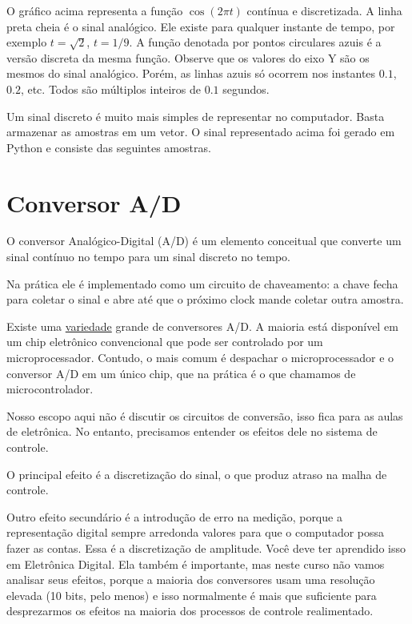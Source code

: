 \documentclass[
]{book}
\begin{document}
O gráfico acima representa a função \(\cos(2\pi t)\) contínua e discretizada. A linha preta cheia é o sinal analógico. Ele existe para qualquer instante de tempo, por exemplo \(t=\sqrt{2}\), \(t=1/9\). A função denotada por pontos circulares azuis é a versão discreta da mesma função. Observe que os valores do eixo Y são os mesmos do sinal analógico. Porém, as linhas azuis só ocorrem nos instantes \(0.1\), \(0.2\), etc. Todos são múltiplos inteiros de \(0.1\) segundos.

Um sinal discreto é muito mais simples de representar no computador. Basta armazenar as amostras em um vetor. O sinal representado acima foi gerado em Python e consiste das seguintes amostras.

\hypertarget{conversor-ad}{%
\section{Conversor A/D}\label{conversor-ad}}

O conversor Analógico-Digital (A/D) é um elemento conceitual que converte um sinal contínuo no tempo para um sinal discreto no tempo.

Na prática ele é implementado como um circuito de chaveamento: a chave fecha para coletar o sinal e abre até que o próximo clock mande coletar outra amostra.

Existe uma \href{https://dewesoft.com/daq/types-of-adc-converters}{variedade} grande de conversores A/D. A maioria está disponível em um chip eletrônico convencional que pode ser controlado por um microprocessador. Contudo, o mais comum é despachar o microprocessador e o conversor A/D em um único chip, que na prática é o que chamamos de microcontrolador.

Nosso escopo aqui não é discutir os circuitos de conversão, isso fica para as aulas de eletrônica. No entanto, precisamos entender os efeitos dele no sistema de controle.

O principal efeito é a discretização do sinal, o que produz atraso na malha de controle.

Outro efeito secundário é a introdução de erro na medição, porque a representação digital sempre arredonda valores para que o computador possa fazer as contas. Essa é a discretização de amplitude. Você deve ter aprendido isso em Eletrônica Digital. Ela também é importante, mas neste curso não vamos analisar seus efeitos, porque a maioria dos conversores usam uma resolução elevada (10 bits, pelo menos) e isso normalmente é mais que suficiente para desprezarmos os efeitos na maioria dos processos de controle realimentado.
\end{document}
